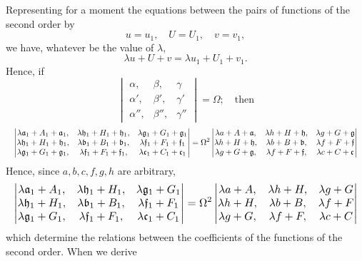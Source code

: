 \documentclass[11pt]{article}
\begin{document}
Representing for a moment the equations between the pairs of functions of the second order by
\[ u = u_1,\quad U = U_1,\quad v = v_1, \]
we have, whatever be the value of $\lambda$,
\[ \lambda u + U + v = \lambda u_1 + U_1 + v_1. \]
Hence, if
\[ \begin{vmatrix} \alpha,&\beta,&\gamma\\ \alpha',&\beta',&\gamma'\\ \alpha'',&\beta'',&\gamma'' \end{vmatrix} = \Omega; \quad \text{then} \]
\[ \resizebox{\textwidth}{!}{$\displaystyle \begin{vmatrix} \lambda\mathfrak{a}_1 + A_1 + \mathfrak{a}_1,& \lambda\mathfrak{h}_1 + H_1 + \mathfrak{h}_1,& \lambda\mathfrak{g}_1 + G_1 + \mathfrak{g}_1\\ \lambda\mathfrak{h}_1 + H_1 + \mathfrak{h}_1,& \lambda\mathfrak{b}_1 + B_1 + \mathfrak{b}_1,& \lambda\mathfrak{f}_1 + F_1 + \mathfrak{f}_1\\ \lambda\mathfrak{g}_1 + G_1 + \mathfrak{g}_1,& \lambda\mathfrak{f}_1 + F_1 + \mathfrak{f}_1,& \lambda\mathfrak{c}_1 + C_1 + \mathfrak{c}_1 \end{vmatrix} = \Omega^2 \begin{vmatrix} \lambda a + A + \mathfrak{a},& \lambda h + H + \mathfrak{h},& \lambda g + G + \mathfrak{g}\\ \lambda h + H + \mathfrak{h},& \lambda b + B + \mathfrak{b},& \lambda f + F + \mathfrak{f}\\ \lambda g + G + \mathfrak{g},& \lambda f + F + \mathfrak{f},& \lambda c + C + \mathfrak{c} \end{vmatrix}$} \]
Hence, since $a,b,c,f,g,h$ are arbitrary,
\[ \resizebox{\textwidth}{!}{$\displaystyle \begin{vmatrix} \lambda\mathfrak{a}_1 + A_1,& \lambda\mathfrak{h}_1 + H_1,& \lambda\mathfrak{g}_1 + G_1\\ \lambda\mathfrak{h}_1 + H_1,& \lambda\mathfrak{b}_1 + B_1,& \lambda\mathfrak{f}_1 + F_1\\ \lambda\mathfrak{g}_1 + G_1,& \lambda\mathfrak{f}_1 + F_1,& \lambda\mathfrak{c}_1 + C_1 \end{vmatrix} = \Omega^2 \begin{vmatrix} \lambda a + A,& \lambda h + H,& \lambda g + G\\ \lambda h + H,& \lambda b + B,& \lambda f + F\\ \lambda g + G,& \lambda f + F,& \lambda c + C \end{vmatrix}$} \]
which determine the relations between the coefficients of the functions of the second order. When we derive
\end{document}
